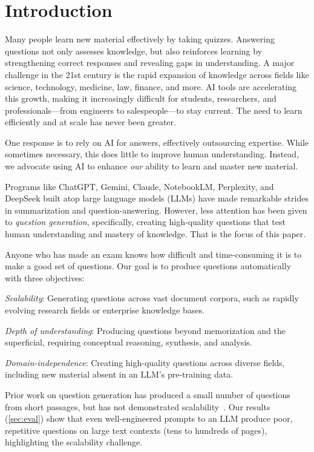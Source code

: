 \section{Introduction}
\label{sec:intro}

Many people learn new material effectively by taking quizzes. Answering questions not only assesses knowledge, but also  reinforces learning by strengthening correct responses and revealing gaps in understanding. A major challenge in the 21st century is the rapid expansion of knowledge across fields like science, technology, medicine, law, finance, and more. AI tools are accelerating this growth, making it increasingly difficult for students, researchers, and professionals---from engineers to salespeople---to stay current. The need to learn efficiently and at scale has never been greater.


One response is to rely on AI for answers, effectively outsourcing expertise. While sometimes necessary, this does little to improve human understanding. Instead, we advocate using AI to enhance {\em our} ability to learn and master new material. %


Programs like ChatGPT, Gemini, Claude, NotebookLM, Perplexity, and DeepSeek built atop large language models (LLMs) have made remarkable strides in summarization and question-answering. However, less attention has been given to {\em question generation}, specifically, creating high-quality questions that test human understanding and mastery of knowledge. That is the focus of this paper.

Anyone who has made an exam knows how difficult and time-consuming it is to make a good set of questions. Our goal is to produce questions automatically with three objectives:
\begin{CompactEnumerate}
\item {\em Scalability}: Generating questions across vast document corpora, such as rapidly evolving research fields or enterprise knowledge bases.
\item {\em Depth of understanding}: Producing questions beyond memorization and the superficial, requiring conceptual reasoning, synthesis, and analysis.
\item {\em Domain-independence}: Creating high-quality questions across diverse fields, including new material absent in an LLM’s pre-training data.
\end{CompactEnumerate}


Prior work on question generation has produced a small number of questions from short passages, but has not demonstrated scalability~\citep{du-etal-2017-learning, Neural_QG, chan-fan-2019-bert, li-etal-2021-addressing-semantic, knowledge_base_prompting, reading_comprehension_language_llm, code_QG, mcq_mult_sentence}. Our results (\autoref{sec:eval}) show that even well-engineered prompts to an LLM produce poor, repetitive questions on large text contexts (tens to hundreds of pages), highlighting the scalability challenge.
 

